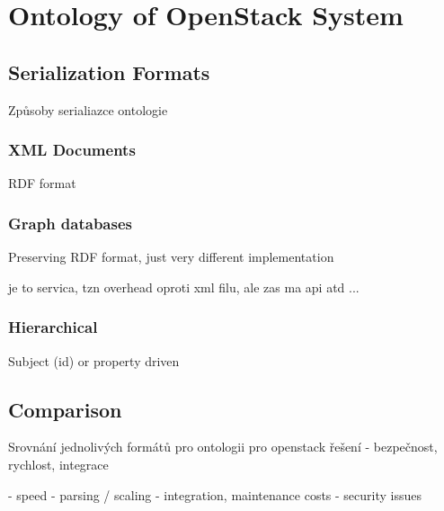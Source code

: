 
\section{Ontology of OpenStack System}

\subsection{Serialization Formats}

Způsoby serialiazce ontologie

\subsubsection{XML Documents}

RDF format

\subsubsection{Graph databases}

Preserving RDF format, just very different implementation 

je to servica, tzn overhead oproti xml filu, ale zas ma api atd ...

\subsubsection{Hierarchical}

Subject (id) or property driven

\subsection{Comparison}

Srovnání jednolivých formátů pro ontologii pro openstack řešení - bezpečnost, rychlost, integrace

- speed - parsing / scaling
- integration, maintenance costs
- security issues

